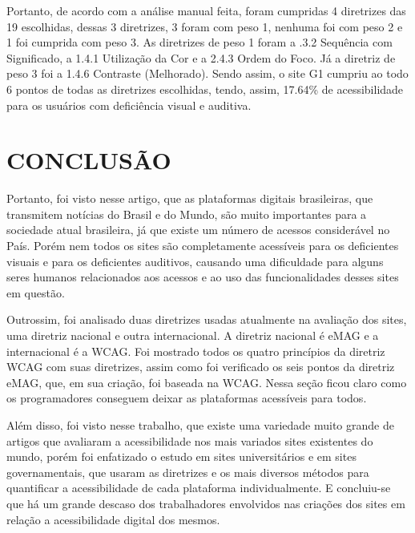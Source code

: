 \documentclass[a4paper]{article}
\begin{document}
\begin{titlepage}
Portanto, de acordo com a análise manual feita, foram cumpridas 4 diretrizes das 19 escolhidas, dessas 3 diretrizes, 3 foram com peso 1, nenhuma foi com peso 2 e 1 foi cumprida com peso 3. As diretrizes de peso 1 foram a .3.2 Sequência com Significado, a 1.4.1 Utilização da Cor e a 2.4.3 Ordem do Foco. Já a diretriz de peso 3 foi a 1.4.6 Contraste (Melhorado). Sendo assim, o site G1 cumpriu ao todo 6 pontos de todas as diretrizes escolhidas, tendo, assim, 17.64\% de acessibilidade para os usuários com deficiência visual e auditiva.

\section{CONCLUSÃO}

Portanto, foi visto nesse artigo, que as plataformas digitais brasileiras, que transmitem notícias do Brasil e do Mundo, são muito importantes para a sociedade atual brasileira, já que existe um número de acessos considerável no País. Porém nem todos os sites são completamente acessíveis para os deficientes visuais e para os deficientes auditivos, causando uma dificuldade para alguns seres humanos relacionados aos acessos e ao uso das funcionalidades desses sites em questão.

Outrossim, foi analisado duas diretrizes usadas atualmente na avaliação dos sites, uma diretriz nacional e outra internacional. A diretriz nacional é eMAG e a internacional é a WCAG. Foi mostrado todos os quatro princípios da diretriz WCAG com suas diretrizes, assim como foi verificado os seis pontos da diretriz eMAG, que, em sua criação, foi baseada na WCAG. Nessa seção ficou claro como os programadores conseguem deixar as plataformas acessíveis para todos.

Além disso, foi visto nesse trabalho, que existe uma variedade muito grande de artigos que avaliaram a acessibilidade nos mais variados sites existentes do mundo, porém foi enfatizado o estudo em sites universitários e em sites governamentais, que usaram as diretrizes e os mais diversos métodos para quantificar a acessibilidade de cada plataforma individualmente. E concluiu-se que há um grande descaso dos trabalhadores envolvidos nas criações dos sites em relação a acessibilidade digital dos mesmos.


\end{titlepage}
\end{document}
